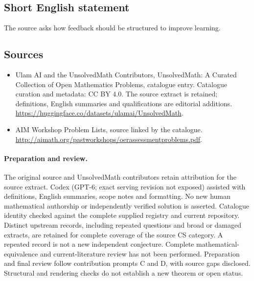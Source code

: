 \documentclass[11pt]{article}
\begin{document}
\subsection{Short English statement}
The source asks how feedback should be structured to improve learning.
\subsection{Sources}
\begin{itemize}
\item[\hypertarget{source:statement:1}{S1}] Ulam AI and the UnsolvedMath Contributors, UnsolvedMath: A Curated Collection of Open Mathematics Problems, catalogue entry. Catalogue curation and metadata: CC BY 4.0. The source extract is retained; definitions, English summaries and qualifications are editorial additions.
\url{https://huggingface.co/datasets/ulamai/UnsolvedMath}.
\item[\hypertarget{source:statement:2}{S2}] AIM Workshop Problem Lists, source linked by the catalogue.
\url{http://aimath.org/pastworkshops/oerassessmentproblems.pdf}.
\end{itemize}
\paragraph{Preparation and review.}
The original source and UnsolvedMath contributors retain attribution for the source extract. Codex (GPT-6; exact serving revision not exposed) assisted with definitions, English summaries, scope notes and formatting. No new human mathematical authorship or independently verified solution is asserted. Catalogue identity checked against the complete supplied registry and current repository. Distinct upstream records, including repeated questions and broad or damaged extracts, are retained for complete coverage of the source CS category. A repeated record is not a new independent conjecture. Complete mathematical-equivalence and current-literature review has not been performed. Preparation and final review follow contribution prompts C and D, with source gaps disclosed. Structural and rendering checks do not establish a new theorem or open status.
\label{end:statement}
\end{document}
